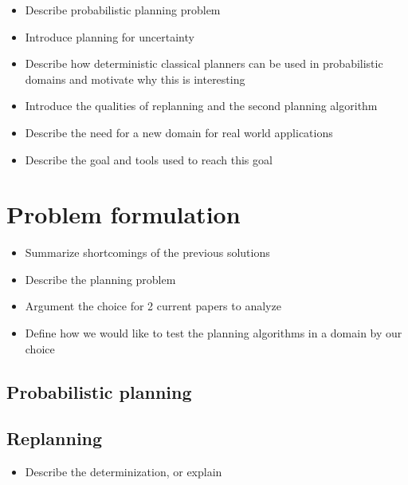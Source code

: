 \documentclass[runningheads,a4paper]{llncs}
\begin{document}
\begin{itemize}
	\item Describe probabilistic planning problem
	\item Introduce planning for uncertainty
	\item Describe how deterministic classical planners can be used in probabilistic domains and motivate why this is interesting
	\item Introduce the qualities of replanning and the second planning algorithm
	\item Describe the need for a new domain for real world applications
	\item Describe the goal and tools used to reach this goal
\end{itemize}


\section{Problem formulation}


\begin{itemize}
	\item Summarize shortcomings of the previous solutions
	\item Describe the planning problem
	\item Argument the choice for 2 current papers to analyze
	\item Define how we would like to test the planning algorithms in a domain by our choice
\end{itemize}

\subsection{Probabilistic planning}

\subsection{Replanning}
\begin{itemize}
	\item Describe the determinization, or explain
\end{itemize}
\end{document}
